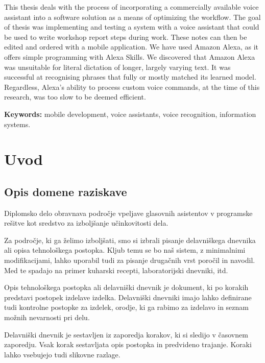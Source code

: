\documentclass[a4paper, 12pt]{book}
\newcommand{\tkeywordsEn}{mobile development, voice assistants, voice recognition, information systems}
\newcommand{\clearemptydoublepage}{\newpage{\pagestyle{empty}\cleardoublepage}}
\begin{document}
\noindent This thesis deals with the process of incorporating a commercially available voice assistant into a software solution as a means of optimizing the workflow.
The goal of thesis was implementing and testing a system with a voice assistant that could be used to write workshop report steps during work.
These notes can then be edited and ordered with a mobile application.
We have used Amazon Alexa, as it offers simple programming with Alexa Skills.
We discovered that Amazon Alexa was unsuitable for literal dictation of longer, largely varying text.
It was successful at recognising phrases that fully or mostly matched its learned model.
Regardless, Alexa's ability to process custom voice commands, at the time of this research, was too slow to be deemed efficient.

\bigskip

\noindent\textbf{Keywords:} \tkeywordsEn.
\clearemptydoublepage

\mainmatter
\setcounter{page}{1}
\pagestyle{fancy}

\chapter{Uvod}
\section{Opis domene raziskave}

Diplomsko delo obravnava področje vpeljave glasovnih asistentov v programske rešitve kot sredstvo za izboljšanje učinkovitosti dela.

Za področje, ki ga želimo izboljšati, smo si izbrali pisanje delavniškega dnevnika ali opisa tehnološkega postopka.
Kljub temu se bo naš sistem, z minimalnimi modifikacijami, lahko uporabil tudi za pisanje drugačnih vrst poročil in navodil.
Med te spadajo na primer kuharski recepti, laboratorijski dnevniki, itd.

Opis tehnološkega postopka ali delavniški dnevnik je dokument, ki po korakih predstavi postopek izdelave izdelka.
Delavniški dnevniki imajo lahko definirane tudi kontrolne postopke za izdelek, orodje, ki ga rabimo za izdelavo in seznam možnih nevarnosti pri delu.

Delavniški dnevnik je sestavljen iz zaporedja korakov, ki si sledijo v časovnem zaporedju.
Vsak korak sestavljata opis postopka in predvideno trajanje.
Koraki lahko vsebujejo tudi slikovne razlage.
\end{document}
